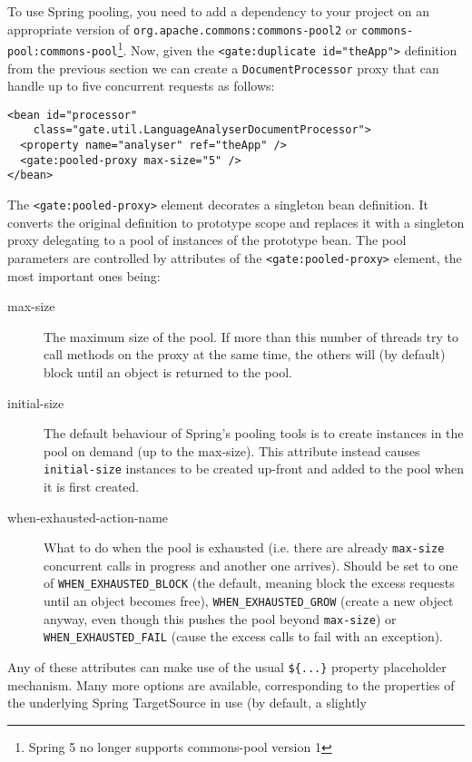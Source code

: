 To use Spring pooling, you need to add a dependency to your project on
an appropriate version of \verb!org.apache.commons:commons-pool2! or
\verb!commons-pool:commons-pool!\footnote{Spring 5 no longer supports
commons-pool version 1}.  Now, given the \verb|<gate:duplicate id="theApp">|
definition from the previous section we can create a \verb|DocumentProcessor|
proxy that can handle up to five concurrent requests as follows:
\begin{small}\begin{verbatim}
<bean id="processor"
    class="gate.util.LanguageAnalyserDocumentProcessor">
  <property name="analyser" ref="theApp" />
  <gate:pooled-proxy max-size="5" />
</bean>
\end{verbatim}\end{small}
%
The \verb|<gate:pooled-proxy>| element decorates a singleton bean definition.
It converts the original definition to prototype scope and replaces it with a
singleton proxy delegating to a pool of instances of the prototype bean.  The
pool parameters are controlled by attributes of the \verb|<gate:pooled-proxy>|
element, the most important ones being:
\begin{description}
\item[max-size] The maximum size of the pool.  If more than this number of
  threads try to call methods on the proxy at the same time, the others will
  (by default) block until an object is returned to the pool.
\item[initial-size] The default behaviour of Spring's pooling tools is to
  create instances in the pool on demand (up to the max-size).  This attribute
  instead causes \texttt{initial-size} instances to be created up-front and
  added to the pool when it is first created.
\item[when-exhausted-action-name] What to do when the pool is exhausted (i.e.
  there are already \texttt{max-size} concurrent calls in progress and another
  one arrives).  Should be set to one of \verb|WHEN_EXHAUSTED_BLOCK| (the
  default, meaning block the excess requests until an object becomes free),
  \verb|WHEN_EXHAUSTED_GROW| (create a new object anyway, even though this
  pushes the pool beyond \texttt{max-size}) or \verb|WHEN_EXHAUSTED_FAIL|
  (cause the excess calls to fail with an exception).
\end{description}
%
Any of these attributes can make use of the usual \verb!${...}! property
placeholder mechanism.  Many more options are available, corresponding to the
properties of the underlying Spring TargetSource in use (by default, a slightly

